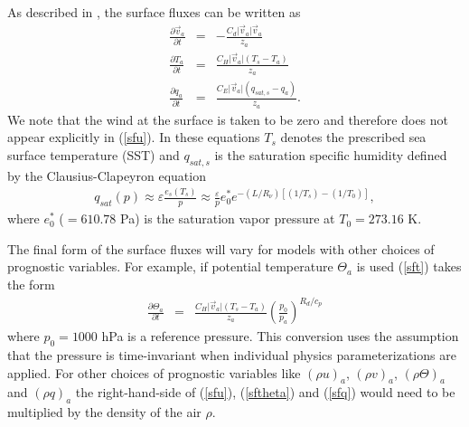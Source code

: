 \documentclass[times,doublespace]{fldauth}
\begin{document}
{\begin{appendix}
As described in \cite{reed2012idealized}, the surface fluxes can be written as
\begin{eqnarray}
\frac{\partial \vec{v}_a}{\partial t} &=& - \frac{C_d \vert \vec{v}_a \vert \vec{v}_a}{z_a} \label{sfu} \\
\frac{\partial T_a}{\partial t} &=& \frac{C_H \vert \vec{v}_a \vert (T_s-T_a)}{z_a} \label{sft} \\
\frac{\partial q_a}{\partial t} &=& \frac{C_E \vert \vec{v}_a \vert(q_{sat,s}-q_a)}{z_a}. \label{sfq}
\end{eqnarray}
We note that the wind at the surface is taken to be zero and therefore does not appear explicitly in (\ref{sfu}).  In these equations $T_s$  denotes the prescribed sea surface temperature (SST) and $q_{sat,s}$ is the saturation specific humidity defined by the Clausius-Clapeyron equation
\begin{eqnarray} \label{qsatcalc}
q_{sat}(p) \approx \varepsilon\frac{e_s(T_s)}{p} \approx \frac{\varepsilon}{p}e^{*}_{0}e^{-(L/R_\nu)[(1/T_s)-(1/T_0)]},
\end{eqnarray}
where $e^{*}_{0}$ ($=610.78$ Pa) is the saturation vapor pressure at $T_0=273.16$ K. 

The final form of the surface fluxes will vary for models with other choices of prognostic variables. For example, if potential temperature $\Theta_a$ is used (\ref{sft}) takes the form
\begin{eqnarray}
\frac{\partial \Theta_a}{\partial t} &=& \frac{C_H \vert \vec{v}_a \vert (T_s-T_a)}{z_a} \left (\frac{p_0}{p_a} \right )^{R_d/c_p} \label{sftheta}
\end{eqnarray}
where $p_0 = 1000$ hPa is a reference pressure. This conversion uses the assumption that the pressure is time-invariant when individual physics parameterizations are applied. For other choices of prognostic variables like $(\rho u)_a$, $(\rho v)_a$, $(\rho \Theta)_a$ and $(\rho q)_a$ the right-hand-side of (\ref{sfu}), (\ref{sftheta}) and (\ref{sfq}) would need to be multiplied by the density of the air $\rho$.


\end{appendix}}
\end{document}

